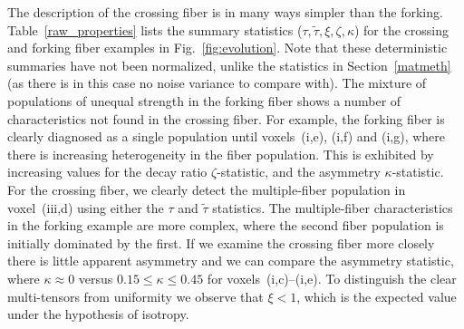 \documentclass[dvips,aoas,preprint]{imsart}
\numberwithin{equation}{section}
\theoremstyle{plain}
\begin{document}
The description of the crossing fiber is in many ways simpler than the
forking.  Table~\ref{raw_properties} lists the summary statistics
($\tau,\tilde\tau,\xi,\zeta,\kappa$) for the crossing and forking
fiber examples in Fig.~\ref{fig:evolution}.  Note that these
deterministic summaries have not been normalized, unlike the
statistics in Section~\ref{matmeth} (as there is in this case no noise variance to compare with).  The mixture of populations of
unequal strength in the forking fiber shows a number of
characteristics not found in the crossing fiber.  For example, the
forking fiber is clearly diagnosed as a single population until
voxels~(i,e), (i,f) and (i,g), where there is increasing heterogeneity
in the fiber population.  This is exhibited by increasing values for
the decay ratio $\zeta$-statistic, and the asymmetry
$\kappa$-statistic.  For the crossing fiber, we clearly detect the
multiple-fiber population in voxel~(iii,d) using either the $\tau$ and
$\tilde\tau$ statistics.  The multiple-fiber characteristics in the
forking example are more complex, where the second fiber population is
initially dominated by the first.  If we examine the crossing fiber
more closely there is little apparent asymmetry and we can compare the
asymmetry statistic, where $\kappa\approx{0}$ versus
$0.15\leq{\kappa}\leq0.45$ for voxels~(i,c)--(i,e).  To distinguish
the clear multi-tensors from uniformity we observe that $\xi<1$, which
is the expected value under the hypothesis of isotropy.
\end{document}
